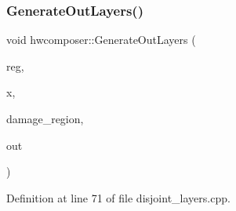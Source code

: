 \subsubsection{\texorpdfstring{Generate\+Out\+Layers()}{GenerateOutLayers()}}
{\footnotesize\ttfamily void hwcomposer\+::\+Generate\+Out\+Layers (\begin{DoxyParamCaption}\item[{\mbox{\hyperlink{structhwcomposer_1_1Region}{Region}} $\ast$}]{reg,  }\item[{uint64\+\_\+t}]{x,  }\item[{const Hwc\+Rect$<$ int $>$ \&}]{damage\+\_\+region,  }\item[{std\+::vector$<$ \mbox{\hyperlink{structhwcomposer_1_1RectSet}{Rect\+Set}}$<$ int $>$$>$ $\ast$}]{out }\end{DoxyParamCaption})}



Definition at line 71 of file disjoint\+\_\+layers.\+cpp.


